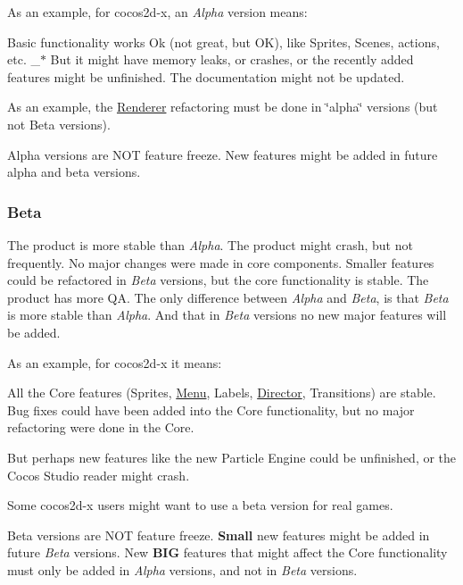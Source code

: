 As an example, for cocos2d-\/x, an {\itshape Alpha} version means\+:


\begin{DoxyItemize}
\item Basic functionality works Ok (not great, but OK), like Sprites, Scenes, actions, etc. \+\_\+$\ast$ But it might have memory leaks, or crashes, or the recently added features might be unfinished. The documentation might not be updated.
\item As an example, the \hyperlink{classRenderer}{Renderer} refactoring must be done in \char`\"{}alpha\char`\"{} versions (but not Beta versions).
\end{DoxyItemize}

Alpha versions are N\+OT feature freeze. New features might be added in future alpha and beta versions.

\subsubsection*{Beta}

The product is more stable than {\itshape Alpha}. The product might crash, but not frequently. No major changes were made in core components. Smaller features could be refactored in {\itshape Beta} versions, but the core functionality is stable. The product has more QA. The only difference between {\itshape Alpha} and {\itshape Beta}, is that {\itshape Beta} is more stable than {\itshape Alpha}. And that in {\itshape Beta} versions no new major features will be added.

As an example, for cocos2d-\/x it means\+:


\begin{DoxyItemize}
\item All the Core features (Sprites, \hyperlink{classMenu}{Menu}, Labels, \hyperlink{classDirector}{Director}, Transitions) are stable. Bug fixes could have been added into the Core functionality, but no major refactoring were done in the Core.
\item But perhaps new features like the new Particle Engine could be unfinished, or the Cocos Studio reader might crash.
\item Some cocos2d-\/x users might want to use a beta version for real games.
\end{DoxyItemize}

Beta versions are N\+OT feature freeze. {\bfseries Small} new features might be added in future {\itshape Beta} versions. New {\bfseries B\+IG} features that might affect the Core functionality must only be added in {\itshape Alpha} versions, and not in {\itshape Beta} versions.

